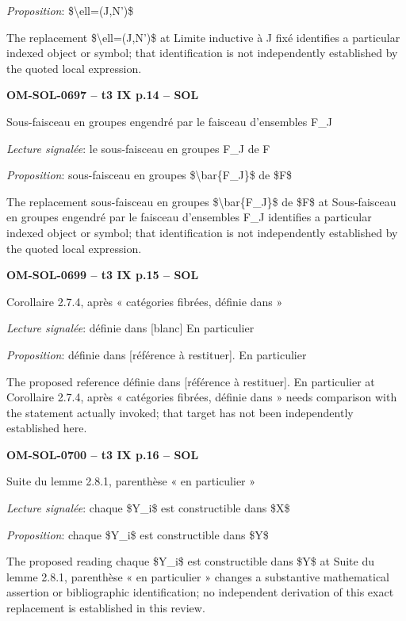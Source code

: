 \emph{Proposition}: \$\textbackslash{}ell=\allowbreak (J,N')\$\par
The replacement \$\textbackslash{}ell=\allowbreak (J,N')\$ at Limite inductive à J fixé identifies a particular indexed object or symbol; that identification is not independently established by the quoted local expression.\par
\par\noindent\textbf{OM-SOL-0697 -- t3 IX p.14 -- SOL}\par
Sous-faisceau en groupes engendré par le faisceau d'ensembles F\_J\par
\emph{Lecture signalée}: le sous-faisceau en groupes F\_J de F\par
\emph{Proposition}: sous-faisceau en groupes \$\textbackslash{}bar\{F\_J\}\$ de \$F\$\par
The replacement sous-faisceau en groupes \$\textbackslash{}bar\{F\_J\}\$ de \$F\$ at Sous-faisceau en groupes engendré par le faisceau d'ensembles F\_J identifies a particular indexed object or symbol; that identification is not independently established by the quoted local expression.\par
\par\noindent\textbf{OM-SOL-0699 -- t3 IX p.15 -- SOL}\par
Corollaire 2.7.4, après « catégories fibrées, définie dans »\par
\emph{Lecture signalée}: définie dans [blanc] En particulier\par
\emph{Proposition}: définie dans [référence à restituer]. En particulier\par
The proposed reference définie dans [référence à restituer]. En particulier at Corollaire 2.7.4, après « catégories fibrées, définie dans » needs comparison with the statement actually invoked; that target has not been independently established here.\par
\par\noindent\textbf{OM-SOL-0700 -- t3 IX p.16 -- SOL}\par
Suite du lemme 2.8.1, parenthèse « en particulier »\par
\emph{Lecture signalée}: chaque \$Y\_i\$ est constructible dans \$X\$\par
\emph{Proposition}: chaque \$Y\_i\$ est constructible dans \$Y\$\par
The proposed reading chaque \$Y\_i\$ est constructible dans \$Y\$ at Suite du lemme 2.8.1, parenthèse « en particulier » changes a substantive mathematical assertion or bibliographic identification; no independent derivation of this exact replacement is established in this review.\par
